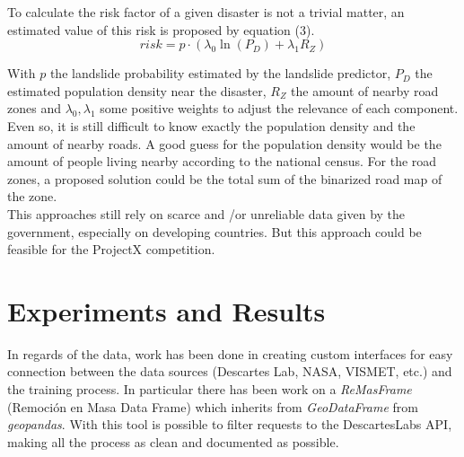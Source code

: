 \documentclass[sigconf, nonacm]{acmart}
\begin{document}
To calculate the risk factor of a given disaster is not a trivial matter, %
an estimated value of this risk is proposed by equation (3).
\begin{equation}
  risk = p \cdot \left( \lambda_0 \ln(P_D) + \lambda_1 R_Z \right)  
\end{equation}

With $p$ the landslide probability estimated by the landslide predictor, $P_D$ the estimated population density near the disaster, $R_Z$ the amount of nearby road zones and $\lambda_0, \lambda_1$ some positive weights to adjust the relevance of each component.\\

Even so, it is still difficult to know exactly the population density and the amount of nearby roads. A good guess for the population density would be the amount of people living nearby according to the national census. For the road zones, a proposed solution could be the total sum of the binarized road map of the zone. \\
This approaches still rely on scarce and \slash or unreliable data given by the government, especially on developing countries. But this approach could be feasible for the ProjectX competition.


\section{Experiments and Results}


In regards of the data, work has been done in creating custom interfaces for easy connection between the data sources (Descartes Lab, NASA, VISMET, etc.) and the training process. In particular there has been work on a \emph{ReMasFrame} (Remoción en Masa Data Frame) which inherits from \emph{GeoDataFrame}
 from \emph{geopandas}. With this tool is possible to filter requests to the DescartesLabs API, making all the process as clean and documented as possible. 
 
\end{document}
